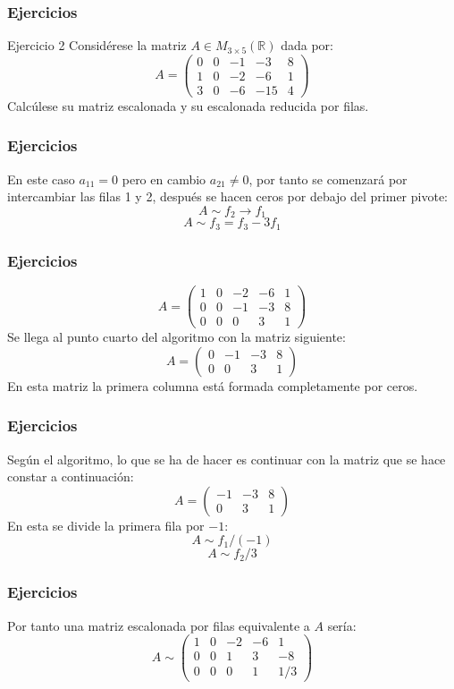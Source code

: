 \documentclass[aspectratio=169]{beamer}
\begin{document}
       \begin{frame}
  \frametitle{Ejercicios}
   \begin{block}{Ejercicio 2}
Consid\'erese la matriz $A\in M_{3\times 5}(\mathbb{R})$ dada por:
\[A= \left(\begin{array}{ccccc}0 & 0 & -1 & -3 & 8 \\1 & 0 & -2 & -6 &1 \\3 & 0 & -6 & -15 & 4\end{array}\right)\]
Calc\'ulese su matriz escalonada y su escalonada reducida por filas. 
\end{block}
  \end{frame} 
    
    
    \begin{frame}
  \frametitle{Ejercicios}
En este caso $a_{11}=0$ pero en cambio $a_{21}\neq 0$, por tanto se comenzar\'a por intercambiar las filas 1 y 2, despu\'es se hacen ceros por debajo del primer pivote:
\[A\sim f_2 \rightarrow f_1\]
\[A\sim f_3 = f_3-3f_1\]
  \end{frame}     
    

    \begin{frame}
  \frametitle{Ejercicios}
\[A= \left(\begin{array}{ccccc}1 & 0 & -2 & -6 &1 \\ 0 & 0 & -1 & -3 & 8 \\ 0 & 0 & 0 & 3 & 1\end{array}\right)\]
Se llega al punto cuarto del algoritmo con la matriz siguiente:
\[A= \left(\begin{array}{cccc} 0 & -1 & -3 & 8 \\ 0 & 0 & 3 & 1\end{array}\right)\]
En esta matriz la primera columna est\'a formada completamente por ceros.
\end{frame}     
  
      \begin{frame}
  \frametitle{Ejercicios}
Seg\'un el algoritmo, lo que se ha de hacer es continuar con la matriz que se hace constar a continuaci\'on:
\[A= \left(\begin{array}{ccc}  -1 & -3 & 8 \\  0 & 3 & 1\end{array}\right)\]
En esta se divide la primera fila por $-1$:
\[A\sim f_1 /(-1)\]
\[A\sim f_2 /3\]

  \end{frame}     
        
 \begin{frame}
  \frametitle{Ejercicios}
Por tanto una matriz escalonada por filas equivalente a $A$ ser\'ia:
\[A\sim \left(\begin{array}{ccccc}1 & 0 & -2 & -6 &1 \\ 0 & 0 & 1 & 3 & -8 \\0 & 0 & 0 & 1 & 1/3\end{array}\right)\]
  \end{frame}     
\end{document}
